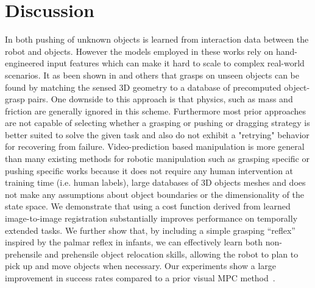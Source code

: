 \section{Discussion}
In both \cite{hermans2013learning,salganicoff1993vision} pushing of unknown objects is learned from interaction data between the robot and objects. However the models employed in these works rely on hand-engineered input features which can make it hard to scale to complex real-world scenarios. 
It as been shown in \cite{goldfeder2009data} and others that grasps on unseen objects can be found by matching the sensed 3D geometry to a database of precomputed object-grasp pairs. One downside to this approach is that physics, such as mass and friction are generally ignored in this scheme. Furthermore most prior approaches are not capable of selecting whether a grasping or pushing or dragging strategy is better suited to solve the given task and also do not exhibit a "retrying" behavior for recovering from failure.
Video-prediction based manipulation is more general than many existing methods for robotic manipulation such as grasping specific \cite{lenz2015deep, goldfeder2009data, zeng2017robotic} or pushing specific works \cite{hermans2013learning, salganicoff1993vision} because it does not require any human intervention at training time (i.e. human labels), large databases of 3D objects meshes and does not make any assumptions about object boundaries or the dimensionality of the state space.
 We demonstrate that using a cost function derived from learned image-to-image registration substantially improves performance on temporally extended tasks. We further show that, by including a simple grasping ``reflex'' inspired by the palmar reflex in infants, we can effectively learn both non-prehensile and prehensile object relocation skills, allowing the robot to plan to pick up and move objects when necessary. Our experiments show a large improvement in success rates compared to a prior visual MPC method~\cite{sna}.
